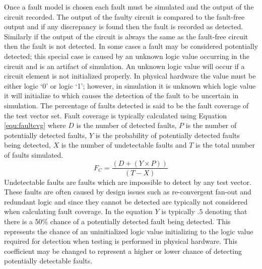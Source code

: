\documentclass[12pt]{report}
\begin{document}
Once a fault model is chosen each fault must be simulated and the output of the circuit recorded.  The output of the faulty circuit is compared to the fault-free output and if any discrepancy is found then the fault is recorded as detected.  Similarly if the output of the circuit is always the same as the fault-free circuit then the fault is not detected\cite{defectforcmos}.  In some cases a fault may be considered potentially detected; this special case is caused by an unknown logic value occurring in the circuit and is an artifact of simulation.  An unknown logic value will occur if a circuit element is not initialized properly\cite{stroud}.  In physical hardware the value must be either logic `0' or logic `1'; however, in simulation it is unknown which logic value it will initialize to which causes the detection of the fault to be uncertain in simulation\cite{stroud}.  The percentage of faults detected is said to be the fault coverage of the test vector set\cite{defectforcmos}\cite{stroud}.  Fault coverage is typically calculated using Equation \ref{equ:faultcvg} where $D$ is the number of detected faults, $P$ is the number of potentially detected faults, $Y$ is the probability of potentially detected faults being detected, $X$ is the number of undetectable faults and $T$ is the total number of faults simulated\cite{stroud}.  
\begin{equation}
F_C = \frac{(D + (Y \times P))}{(T - X)}
\label{equ:faultcvg}
\end{equation}
Undetectable faults are faults which are impossible to detect by any test vector.  These faults are often caused by design issues such as re-convergent fan-out and redundant logic\cite{stroud} and since they cannot be detected are typically not considered when calculating fault coverage.  In the equation $Y$ is typically $.5$ denoting that there is a 50\% chance of a potentially detected fault being detected.  This represents the chance of an uninitialized logic value initializing to the logic value required for detection when testing is performed in physical hardware.  This coefficient may be changed to represent a higher or lower chance of detecting potentially detectable faults\cite{stroud}.
\end{document}
